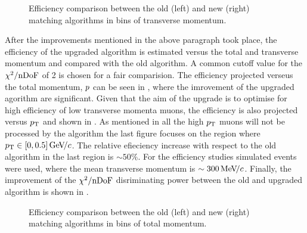 \begin{figure}[t]
  \centering
  \begin{subfigure}{0.5\textwidth}
    \scalebox{.6}{}
    \caption{}
    \label{mvTTm_eff_p}
  \end{subfigure}%
  \hfill%
  \begin{subfigure}{0.5\textwidth}
    \scalebox{.6}{}
    \caption{}
    \label{mvm_eff_p}
  \end{subfigure}
  \caption{Efficiency comparison between the old (left) and new (right) matching algorithms in bins of transverse momentum.}
 \label{mvm_eff_pt_zoom_comp}
\end{figure}

After the improvements mentioned in the above paragraph took place, the efficiency of the upgraded \mvTTm algorithm
is estimated versus the total and transverse momentum and compared with the old algorithm. A common cutoff value for
the $\chi^2/{\rm nDoF}$ of 2 is chosen for a fair comparision. The efficiency projected verseus the total momentum, $\mbox{$p$}$
can be seen in , where the imrovement of the upgraded \mvTTm agorithm are significant.
Given that the aim of the \mvTTm upgrade is to optimise for high efficiency of low transverse momenta muons,
the efficiency is also projected versus $\mbox{$p_{\rm T}$}$ and shown in . As mentioned in 
all the high $\mbox{$p_{\rm T}$}$ muons will not be processed by the \mvTTm algorithm the last figure focuses on the region where $\mbox{$p_{\rm T}$}\in[0,0.5]{\mathrm{\,Ge\kern -0.1em V\!/}c}$.
The relative efieciency increase with respect to the old \mvm algorithm in the last region is $\sim 50\%$.
For the efficiency studies simulated \Sigmapmumu events were used, where the mean transverse momentum is $\sim 300{\mathrm{\,Me\kern -0.1em V\!/}c}$.
Finally, the improvement of the $\chi^2/{\rm nDoF}$ disriminating power between the old and upgraded algorithm is shown in .

\begin{figure}[t]
  \centering
  \begin{subfigure}{0.5\textwidth}
    \scalebox{.6}{}
    \caption{}
    \label{mvTTm_eff_p}
  \end{subfigure}%
  \hfill%
  \begin{subfigure}{0.5\textwidth}
    \scalebox{.6}{}
    \caption{}
    \label{mvm_eff_p}
  \end{subfigure}
  \caption{Efficiency comparison between the old (left) and new (right) matching algorithms in bins of total momentum.}
 \label{mvm_eff_p_comp}
\end{figure}

